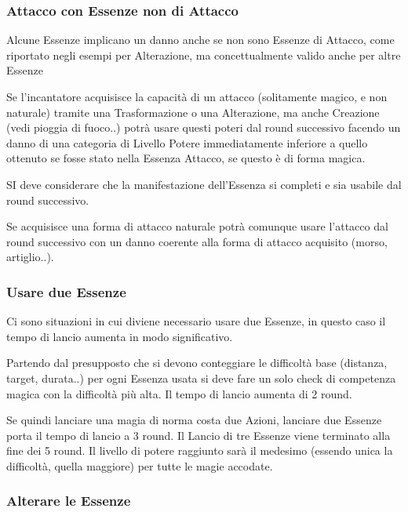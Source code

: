 \documentclass[a4paper,11pt,twoside,openany]{book}
\begin{document}
\label{altre-regole}

\subsubsection{Attacco con Essenze non di Attacco}

Alcune Essenze implicano un danno anche se non sono Essenze di Attacco, come riportato negli esempi per Alterazione, ma concettualmente valido anche per altre Essenze

Se l'incantatore acquisisce la capacità di un attacco (solitamente magico, e non naturale) tramite una Trasformazione o una Alterazione, ma anche Creazione (vedi pioggia di fuoco..) potrà usare questi poteri dal round successivo facendo un danno di una categoria di Livello Potere immediatamente inferiore a quello ottenuto se fosse stato nella Essenza Attacco, se questo è di forma magica.

SI deve considerare che la manifestazione dell'Essenza si completi e sia usabile dal round successivo.

Se acquisisce una forma di attacco naturale potrà comunque usare l'attacco dal round successivo con un danno coerente alla forma di attacco acquisito (morso, artiglio..).

\subsubsection{Usare due Essenze}

Ci sono situazioni in cui diviene necessario usare due Essenze, in questo caso il tempo di lancio aumenta in modo significativo.

Partendo dal presupposto che si devono conteggiare le difficoltà base (distanza, target, durata..) per ogni Essenza usata si deve fare un solo check di competenza magica con la difficoltà più alta. Il tempo di lancio aumenta di 2 round.

Se quindi lanciare una magia di norma costa due Azioni, lanciare due Essenze porta il tempo di lancio a 3 round. Il Lancio di tre Essenze viene terminato alla fine dei 5 round. Il livello di potere raggiunto sarà il medesimo (essendo unica la difficoltà, quella maggiore) per tutte le magie accodate.

\subsubsection{Alterare le Essenze}
\end{document}
